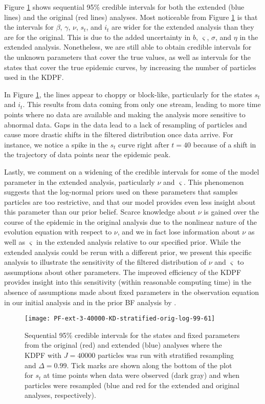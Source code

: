 \documentclass{elsarticle}
\begin{document}
Figure \ref{fig:ext} shows sequential 95\% credible intervals for both the extended (blue lines) and the original (red lines) analyses. Most noticeable from Figure \ref{fig:ext} is that the intervals for $\beta$, $\gamma$, $\nu$, $s_t$, and $i_t$ are wider for the extended analysis than they are for the original. This is due to the added uncertainty in $b$, $\varsigma$, $\sigma$, and $\eta$ in the extended analysis. Nonetheless, we are still able to obtain credible intervals for the unknown parameters that cover the true values, as well as intervals for the states that cover the true epidemic curves, by increasing the number of particles used in the KDPF.

In Figure \ref{fig:ext}, the lines appear to choppy or block-like, particularly for the states $s_t$ and $i_t$. This results from data coming from only one stream, leading to more time points where no data are available and making the analysis more sensitive to abnormal data. Gaps in the data lead to a lack of resampling of particles and cause more drastic shifts in the filtered distribution once data arrive.
For instance, we notice a spike in the $s_t$ curve right after $t = 40$ because of a shift in the trajectory of data points near the epidemic peak.

Lastly, we comment on a widening of the credible intervals for some of the model parameter in the extended analysis, particularly $\nu$ and $\varsigma$. This phenomenon suggests that the log-normal priors used on these parameters that samples particles are too restrictive, and that our model provides even less insight about this parameter than our prior belief. Scarce knowledge about $\nu$ is gained over the course of the epidemic in the original analysis due to the nonlinear nature of the evolution equation with respect to $\nu$, and we in fact lose information about $\nu$ as well as $\varsigma$ in the extended analysis relative to our specified prior. While the extended analysis could be rerun with a different prior, we present this specific analysis to illustrate the sensitivity of the filtered distribution of $\nu$ and $\varsigma$ to assumptions about other parameters. The improved efficiency of the KDPF provides insight into this sensitivity (within reasonable computing time) in the absence of assumptions made about fixed parameters in the observation equation in our initial analysis and in the prior BF analysis by \citet{skvortsov2012monitoring}.

\begin{figure}
\centering
\texttt{[image: PF-ext-3-40000-KD-stratified-orig-log-99-61]}
\caption{Sequential 95\% credible intervals for the states and fixed parameters from the original (red) and extended (blue) analyses where the KDPF with $J = 40000$ particles was run with stratified resampling and $\Delta = 0.99$. Tick marks are shown along the bottom of the plot for $s_t$ at time points when data were observed (dark gray) and when particles were resampled (blue and red for the extended and original analyses, respectively).} \label{fig:ext}
\end{figure}
\end{document}
